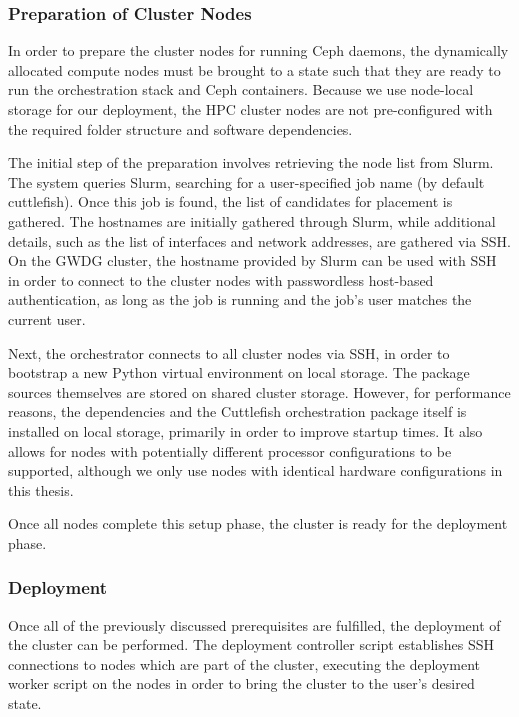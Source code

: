\subsubsection{Preparation of Cluster Nodes}

In order to prepare the cluster nodes for running Ceph daemons, the dynamically allocated compute nodes must be brought to a state such that they are ready to run the orchestration stack and Ceph containers. Because we use node-local storage for our deployment, the \ac{HPC} cluster nodes are not pre-configured with the required folder structure and software dependencies.

The initial step of the preparation involves retrieving the node list from Slurm. The system queries Slurm, searching for a user-specified job name (by default cuttlefish). Once this job is found, the list of candidates for placement is gathered. The hostnames are initially gathered through Slurm, while additional details, such as the list of interfaces and network addresses, are gathered via \ac{SSH}. On the \ac{GWDG} cluster, the hostname provided by Slurm can be used with \ac{SSH} in order to connect to the cluster nodes with passwordless host-based authentication, as long as the job is running and the job's user matches the current user.

Next, the orchestrator connects to all cluster nodes via \ac{SSH}, in order to bootstrap a new Python virtual environment on local storage. The package sources themselves are stored on shared cluster storage. However, for performance reasons, the dependencies and the Cuttlefish orchestration package itself is installed on local storage, primarily in order to improve startup times. It also allows for nodes with potentially different processor configurations to be supported, although we only use nodes with identical hardware configurations in this thesis.

Once all nodes complete this setup phase, the cluster is ready for the deployment phase.

\subsubsection{Deployment}

Once all of the previously discussed prerequisites are fulfilled, the deployment of the cluster can be performed. The deployment controller script establishes \ac{SSH} connections to nodes which are part of the cluster, executing the deployment worker script on the nodes in order to bring the cluster to the user's desired state.

